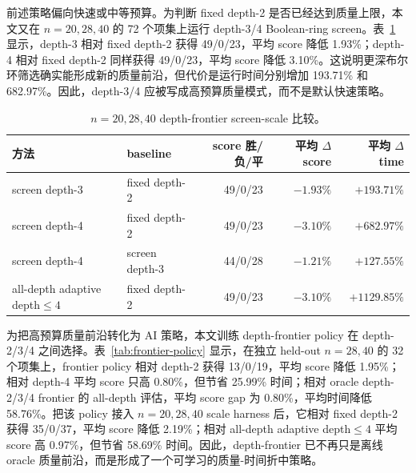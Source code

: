 \documentclass[UTF8,fontset=macnew,11pt]{ctexart}
\newcommand{\screen}{Boolean-ring screen}
\begin{document}
前述策略偏向快速或中等预算。为判断 fixed depth-2 是否已经达到质量上限，本文又在 $n=20,28,40$ 的 72 个项集上运行 depth-3/4 \screen{}。表~\ref{tab:frontier} 显示，depth-3 相对 fixed depth-2 获得 49/0/23，平均 score 降低 1.93\%；depth-4 相对 fixed depth-2 同样获得 49/0/23，平均 score 降低 3.10\%。这说明更深布尔环筛选确实能形成新的质量前沿，但代价是运行时间分别增加 193.71\% 和 682.97\%。因此，depth-3/4 应被写成高预算质量模式，而不是默认快速策略。

\begin{table}[H]
\centering
\scriptsize
\caption{$n=20,28,40$ depth-frontier screen-scale 比较。}
\label{tab:frontier}
\begin{tabular}{llrrr}
\toprule
方法 & baseline & score 胜/负/平 & 平均 $\Delta$ score & 平均 $\Delta$ time \\
\midrule
screen depth-3 & fixed depth-2 & 49/0/23 & $-1.93\%$ & $+193.71\%$ \\
screen depth-4 & fixed depth-2 & 49/0/23 & $-3.10\%$ & $+682.97\%$ \\
screen depth-4 & screen depth-3 & 44/0/28 & $-1.21\%$ & $+127.55\%$ \\
all-depth adaptive depth$\leq4$ & fixed depth-2 & 49/0/23 & $-3.10\%$ & $+1129.85\%$ \\
\bottomrule
\end{tabular}
\end{table}

为把高预算质量前沿转化为 AI 策略，本文训练 depth-frontier policy 在 depth-2/3/4 之间选择。表~\ref{tab:frontier-policy} 显示，在独立 held-out $n=28,40$ 的 32 个项集上，frontier policy 相对 depth-2 获得 13/0/19，平均 score 降低 1.95\%；相对 depth-4 平均 score 只高 0.80\%，但节省 25.99\% 时间；相对 oracle depth-2/3/4 frontier 的 all-depth 评估，平均 score gap 为 0.80\%，平均时间降低 58.76\%。把该 policy 接入 $n=20,28,40$ scale harness 后，它相对 fixed depth-2 获得 35/0/37，平均 score 降低 2.19\%；相对 all-depth adaptive depth$\leq4$ 平均 score 高 0.97\%，但节省 58.69\% 时间。因此，depth-frontier 已不再只是离线 oracle 质量前沿，而是形成了一个可学习的质量-时间折中策略。
\end{document}

